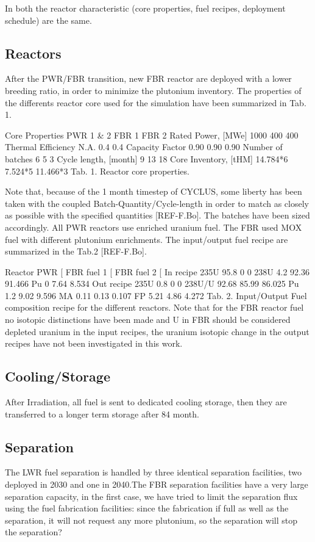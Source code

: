 \documentclass[12pt]{article}
\begin{document}
In both the reactor characteristic (core properties, fuel recipes, deployment schedule) are the same. 
\subsection{Reactors}
After the PWR/FBR transition, new FBR reactor are deployed with a lower breeding ratio, in order to minimize the plutonium inventory. The properties of the differents reactor core used for the simulation have been summarized in Tab. 1.

Core Properties
PWR 1 \& 2
FBR 1
FBR 2
Rated Power, [MWe]
1000
400
400
Thermal Efficiency
N.A.
0.4
0.4
Capacity Factor
0.90
0.90
0.90
Number of batches
6
5
3
Cycle length, [month]
9
13
18
Core Inventory, [tHM]
14.784*6
7.524*5
11.466*3
Tab. 1. Reactor core properties.

Note that, because of the 1 month timestep of CYCLUS, some liberty has been taken with the coupled Batch-Quantity/Cycle-length in order to match as closely as possible with the specified quantities [REF-F.Bo]. The batches have been sized accordingly. All PWR reactors use enriched uranium fuel. The FBR used MOX fuel with different plutonium enrichments. The input/output fuel recipe are summarized in the Tab.2 [REF-F.Bo].


Reactor
PWR [%
FBR fuel 1  [%
FBR fuel 2  [%
In recipe
235U
95.8
0
0
238U
4.2
92.36
91.466
Pu
0
7.64
8.534
Out recipe
235U
0.8
0
0
238U/U
92.68
85.99
86.025
Pu
1.2
9.02
9.596
MA
0.11
0.13
0.107
FP
5.21
4.86
4.272
Tab. 2. Input/Output Fuel composition recipe for the different reactors. Note that for the FBR reactor fuel no isotopic distinctions have been made and U in FBR should be considered depleted uranium in the input recipes, the uranium isotopic change in the output recipes have not been investigated in this work.  

\subsection{Cooling/Storage}
After Irradiation, all fuel is sent to dedicated cooling storage, then they are transferred to a longer term storage after 84 month.
\subsection{Separation}

The LWR fuel separation is handled by three identical separation facilities, two deployed in 2030 and one in 2040.The FBR separation facilities have a very large separation capacity, in the first case, we have tried to limit the separation flux using the fuel fabrication facilities: since the fabrication if full as well as the separation, it will not request any more plutonium, so the separation will stop the separation?
\end{document}
